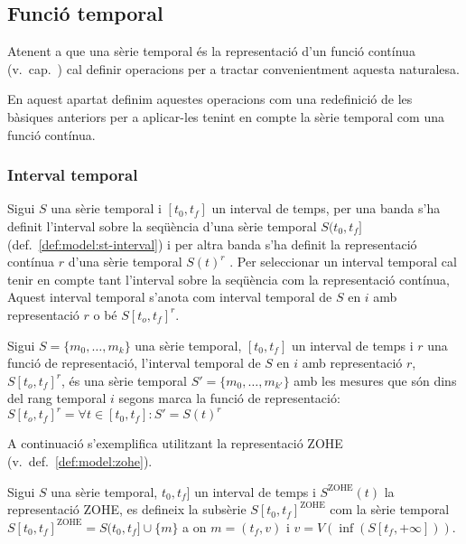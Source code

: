 \subsection{Funció temporal}
\label{sec:sgst:operadors-temporals}

Atenent a que una sèrie temporal és la representació d'un funció
contínua (v.\ cap.~)
cal definir operacions per a tractar convenientment aquesta
naturalesa.

En aquest apartat definim aquestes operacions com una redefinició de
les bàsiques anteriors per a aplicar-les tenint en compte la sèrie
temporal com una funció contínua.



\subsubsection{Interval temporal}

Sigui $S$ una sèrie temporal i $[t_0,t_f]$ un interval de temps, per
una banda s'ha definit l'interval sobre la seqüència d'una sèrie
temporal $S(t_0,t_f]$ (def.~\ref{def:model:st-interval}) i per altra
banda s'ha definit la representació contínua $r$ d'una sèrie temporal
$S(t)^r$ .  Per seleccionar un
interval temporal cal tenir en compte tant l'interval sobre la
seqüència com la representació contínua, Aquest interval temporal
s'anota com interval temporal de $S$ en $i$ amb representació $r$ o bé
$S[t_o,t_f]^r$.



\begin{definition}
  Sigui $S=\{m_0, \ldots, m_k\}$ una sèrie temporal, $[t_0,t_f]$ un
  interval de temps i $r$ una funció de representació, l'interval
  temporal de $S$ en $i$ amb representació $r$, $S[t_o,t_f]^r$, és una
  sèrie temporal $S'=\{m_0, \ldots, m_{k'}\}$ amb les mesures que són
  dins del rang temporal $i$ segons marca la funció de representació:
  $S[t_o,t_f]^r= \forall t \in [t_0,t_f] : S' = S(t)^r $
\end{definition}


A continuació s'exemplifica utilitzant la representació ZOHE (v.\
def.~\ref{def:model:zohe}).
\begin{definition}
  \label{def:sgst:interval-temporal-zohe}
  Sigui $S$ una sèrie temporal, $t_0,t_f]$ un interval de temps i
  $S^\text{ZOHE}(t)$ la representació ZOHE, es defineix la subsèrie
  $S[t_0,t_f]^{\text{ZOHE}}$ com la sèrie temporal
  $S[t_0,t_f]^{\text{ZOHE}} = S(t_0,t_f] \cup \{m\}$ a on $m=(t_f,v)$
  i $v= V(\inf( S[t_f,+\infty] ))$.
\end{definition}



